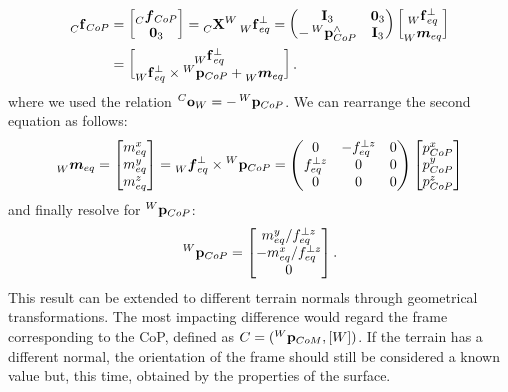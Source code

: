 \begin{align*}
    \forcesix[C]_{CoP} &= \begin{bmatrix}
        \forcelin[C]_{CoP} \\ \zeros_3
    \end{bmatrix} =
    \transfor[C]^W \forcesix[W]_{eq}^\perp =
    \begin{pmatrix}
        \eye_3 & \zeros_3 \\
        -\pos[W]_{CoP}^\wedge & \eye_3
    \end{pmatrix}
    \begin{bmatrix}
        \forcesix[W]_{eq}^\perp \\ \forceang[W]_{eq}
    \end{bmatrix} \\
    &=
    \begin{bmatrix}
        \forcesix[W]_{eq}^\perp \\
        \forcesix[W]_{eq}^\perp \times \pos[W]_{CoP} + \forceang[W]_{eq}
    \end{bmatrix}
    .
\end{align*}
%
where we used the relation $\ori[C]_W = -\pos[W]_{CoP}$.
We can rearrange the second equation as follows:
%
\begin{equation*}
    \forceang[W]_{eq} =
    \begin{bmatrix}
        m_{eq}^{x} \\
        m_{eq}^{y} \\
        m_{eq}^{z}
    \end{bmatrix} =
    \forcelin[W]_{eq}^\perp \times \pos[W]_{CoP} =
    \begin{pmatrix}
        0 & - f_{eq}^{\perp z} & 0 \\
        f_{eq}^{\perp z} & 0 & 0 \\
        0 & 0 & 0
    \end{pmatrix}
    \begin{bmatrix}
        p_{CoP}^{x} \\
        p_{CoP}^{y} \\
        p_{CoP}^{z}
    \end{bmatrix}
\end{equation*}
%
and finally resolve for $\pos[W]_{CoP}$:
%
\begin{equation*}
    \pos[W]_{CoP} =
    \begin{bmatrix}
        m_{eq}^{y} / f_{eq}^{\perp z} \\
        -m_{eq}^{x} / f_{eq}^{\perp z} \\
        0
    \end{bmatrix}
    .
\end{equation*}
%
This result can be extended to different terrain normals through geometrical transformations.
The most impacting difference would regard the frame corresponding to the \ac{CoP}, defined as $C = (\pos[W]_{CoM}, [W])$.
If the terrain has a different normal, the orientation of the frame should still be considered a known value but, this time, obtained by the properties of the surface.
